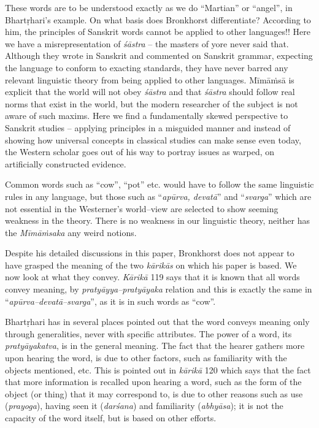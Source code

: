 These words are to be understood exactly as we do “Martian” or “angel”, in Bhartṛhari’s example. On what basis does Bronkhorst differentiate? According to him, the principles of Sanskrit words cannot be applied to other languages!! Here we have a misrepresentation of \textit{śāstra} – the masters of yore never said that. Although they wrote in Sanskrit and commented on Sanskrit grammar, expecting the language to conform to exacting standards, they have never barred any relevant linguistic theory from being applied to other languages. Mīmāṁsā is explicit that the world will not obey \textit{śāstra} and that \textit{śāstra} should follow real norms that exist in the world, but the modern researcher of the subject is not aware of such maxims. Here we find a fundamentally skewed perspective to Sanskrit studies – applying principles in a misguided manner and instead of showing how universal concepts in classical studies can make sense even today, the Western scholar goes out of his way to portray issues as warped, on artificially constructed evidence.

Common words such as “cow”, “pot” etc. would have to follow the same linguistic rules in any language, but those such as “\textit{apūrva, devatā}” and “\textit{svarga}” which are not essential in the Westerner’s world–view are selected to show seeming weakness in the theory. There is no weakness in our linguistic theory, neither has the \textit{Mīmāṁsaka} any weird notions.

Despite his detailed discussions in this paper, Bronkhorst does not appear to have grasped the meaning of the two \textit{kārikās} on which his paper is based. We now look at what they convey. \textit{Kārikā} 119 says that it is known that all words convey meaning, by \textit{pratyāyya–pratyāyaka} relation and this is exactly the same in “\textit{apūrva–devatā–svarga}”, as it is in such words as “cow”.

Bhartṛhari has in several places pointed out that the word conveys meaning only through generalities, never with specific attributes. The power of a word, its \textit{pratyāyakatva}, is in the general meaning. The fact that the hearer gathers more upon hearing the word, is due to other factors, such as familiarity with the objects mentioned, etc. This is pointed out in \textit{kārikā} 120 which says that the fact that more information is recalled upon hearing a word, such as the form of the object (or thing) that it may correspond to, is due to other reasons such as use (\textit{prayoga}), having seen it (\textit{darśana}) and familiarity (\textit{abhyāsa}); it is not the capacity of the word itself, but is based on other efforts.

